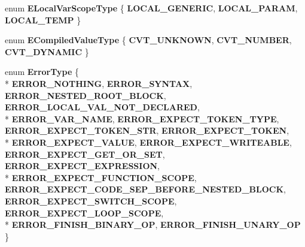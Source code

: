 \begin{DoxyCompactItemize}
\item 
enum {\bfseries E\+Local\+Var\+Scope\+Type} \{ {\bfseries L\+O\+C\+A\+L\+\_\+\+G\+E\+N\+E\+R\+IC}, 
{\bfseries L\+O\+C\+A\+L\+\_\+\+P\+A\+R\+AM}, 
{\bfseries L\+O\+C\+A\+L\+\_\+\+T\+E\+MP}
 \}\hypertarget{class_object_script_1_1_o_s_1_1_core_1_1_compiler_a963a18ec3beda8aed3338ebd3c294fa5}{}\label{class_object_script_1_1_o_s_1_1_core_1_1_compiler_a963a18ec3beda8aed3338ebd3c294fa5}

\item 
enum {\bfseries E\+Compiled\+Value\+Type} \{ {\bfseries C\+V\+T\+\_\+\+U\+N\+K\+N\+O\+WN}, 
{\bfseries C\+V\+T\+\_\+\+N\+U\+M\+B\+ER}, 
{\bfseries C\+V\+T\+\_\+\+D\+Y\+N\+A\+M\+IC}
 \}\hypertarget{class_object_script_1_1_o_s_1_1_core_1_1_compiler_a22bf62ee44969e54e9af51fee67f0d42}{}\label{class_object_script_1_1_o_s_1_1_core_1_1_compiler_a22bf62ee44969e54e9af51fee67f0d42}

\item 
enum {\bfseries Error\+Type} \{ \\*
{\bfseries E\+R\+R\+O\+R\+\_\+\+N\+O\+T\+H\+I\+NG}, 
{\bfseries E\+R\+R\+O\+R\+\_\+\+S\+Y\+N\+T\+AX}, 
{\bfseries E\+R\+R\+O\+R\+\_\+\+N\+E\+S\+T\+E\+D\+\_\+\+R\+O\+O\+T\+\_\+\+B\+L\+O\+CK}, 
{\bfseries E\+R\+R\+O\+R\+\_\+\+L\+O\+C\+A\+L\+\_\+\+V\+A\+L\+\_\+\+N\+O\+T\+\_\+\+D\+E\+C\+L\+A\+R\+ED}, 
\\*
{\bfseries E\+R\+R\+O\+R\+\_\+\+V\+A\+R\+\_\+\+N\+A\+ME}, 
{\bfseries E\+R\+R\+O\+R\+\_\+\+E\+X\+P\+E\+C\+T\+\_\+\+T\+O\+K\+E\+N\+\_\+\+T\+Y\+PE}, 
{\bfseries E\+R\+R\+O\+R\+\_\+\+E\+X\+P\+E\+C\+T\+\_\+\+T\+O\+K\+E\+N\+\_\+\+S\+TR}, 
{\bfseries E\+R\+R\+O\+R\+\_\+\+E\+X\+P\+E\+C\+T\+\_\+\+T\+O\+K\+EN}, 
\\*
{\bfseries E\+R\+R\+O\+R\+\_\+\+E\+X\+P\+E\+C\+T\+\_\+\+V\+A\+L\+UE}, 
{\bfseries E\+R\+R\+O\+R\+\_\+\+E\+X\+P\+E\+C\+T\+\_\+\+W\+R\+I\+T\+E\+A\+B\+LE}, 
{\bfseries E\+R\+R\+O\+R\+\_\+\+E\+X\+P\+E\+C\+T\+\_\+\+G\+E\+T\+\_\+\+O\+R\+\_\+\+S\+ET}, 
{\bfseries E\+R\+R\+O\+R\+\_\+\+E\+X\+P\+E\+C\+T\+\_\+\+E\+X\+P\+R\+E\+S\+S\+I\+ON}, 
\\*
{\bfseries E\+R\+R\+O\+R\+\_\+\+E\+X\+P\+E\+C\+T\+\_\+\+F\+U\+N\+C\+T\+I\+O\+N\+\_\+\+S\+C\+O\+PE}, 
{\bfseries E\+R\+R\+O\+R\+\_\+\+E\+X\+P\+E\+C\+T\+\_\+\+C\+O\+D\+E\+\_\+\+S\+E\+P\+\_\+\+B\+E\+F\+O\+R\+E\+\_\+\+N\+E\+S\+T\+E\+D\+\_\+\+B\+L\+O\+CK}, 
{\bfseries E\+R\+R\+O\+R\+\_\+\+E\+X\+P\+E\+C\+T\+\_\+\+S\+W\+I\+T\+C\+H\+\_\+\+S\+C\+O\+PE}, 
{\bfseries E\+R\+R\+O\+R\+\_\+\+E\+X\+P\+E\+C\+T\+\_\+\+L\+O\+O\+P\+\_\+\+S\+C\+O\+PE}, 
\\*
{\bfseries E\+R\+R\+O\+R\+\_\+\+F\+I\+N\+I\+S\+H\+\_\+\+B\+I\+N\+A\+R\+Y\+\_\+\+OP}, 
{\bfseries E\+R\+R\+O\+R\+\_\+\+F\+I\+N\+I\+S\+H\+\_\+\+U\+N\+A\+R\+Y\+\_\+\+OP}
 \}\hypertarget{class_object_script_1_1_o_s_1_1_core_1_1_compiler_af9c623e162101a0f290f04211e25db6c}{}\label{class_object_script_1_1_o_s_1_1_core_1_1_compiler_af9c623e162101a0f290f04211e25db6c}


\end{DoxyCompactItemize}
